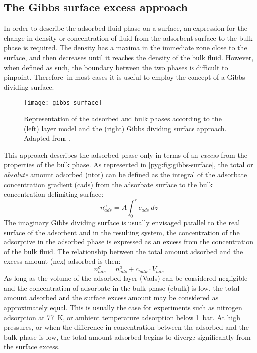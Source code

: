 \subsection{The Gibbs surface excess approach}\label{pyg:models:gibbs}

In order to describe the adsorbed fluid phase on a surface, 
an expression for the change in density or concentration of fluid
from the adsorbent surface to the bulk phase is required. The density
has a maxima in the immediate zone close to the surface, and then
decreases until it reaches the density of the bulk fluid.
However, when defined as such, the boundary between the
two phases is difficult to pinpoint.
Therefore, in most cases it is useful to employ the concept
of a Gibbs dividing surface.

\begin{figure}[htb]
	\centering
	\texttt{[image: gibbs-surface]}
	\caption{
		Representation of the adsorbed and bulk phases according to
		the (left) layer model and the (right) Gibbs dividing surface
		approach. Adapted from \citet{rouquerolAdsorptionPowdersPorous2013}.
	}\label{pyg:fig:gibbs-surface}
\end{figure}

This approach describes the adsorbed phase only in terms
of an \textit{excess} from the properties of the bulk phase.
As represented in \autoref{pyg:fig:gibbs-surface}, the total
or \textit{absolute} amount adsorbed (\gls{ntot}) can be defined as
the integral of the adsorbate concentration gradient (\gls{cads}) from 
the adsorbate surface to the bulk concentration delimiting surface:
%
\begin{equation}
	n_{ads}^{a} = A \int_0^r c_{ads}\ dz
\end{equation}
%
The imaginary Gibbs dividing surface is usually envisaged parallel to
the real surface of the adsorbent and in the resulting system, the
concentration of the adsorptive in the adsorbed phase is
expressed as an excess from the concentration of the bulk fluid.
The relationship between the total amount adsorbed and the
excess amount (\gls{nex}) adsorbed is then:
%
\begin{equation}\label{pyg:eqn:total-excess}
	n_{ads}^{\sigma} = n_{ads}^{a} +  c_{bulk} \cdot V_{ads}
\end{equation}
%
As long as the volume of the adsorbed layer (\gls{Vads}) can be
considered negligible and the concentration of adsorbate in the bulk
phase (\gls{cbulk}) is low, the total amount adsorbed and the surface
excess amount may be considered as approximately equal.
This is usually the case for experiments such as nitrogen
adsorption at \SI{77}{\kelvin}, or ambient temperature adsorption
below \SI{1}{\bar}.
At high pressures, or when the difference in concentration between
the adsorbed and the bulk phase is low, the total amount adsorbed
begins to diverge significantly from the surface excess.


